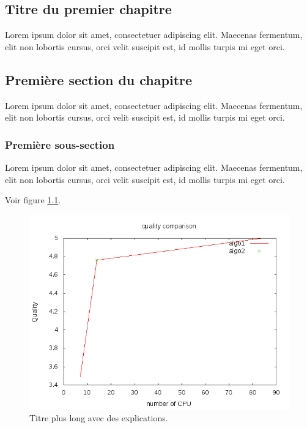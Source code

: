 \begin{bibunit}

\clearemptydoublepage
\chapter{Titre du premier chapitre}
\label{chap:1}

Lorem ipsum dolor sit amet, consectetuer adipiscing elit. Maecenas fermentum, elit non lobortis cursus, orci velit suscipit est, id mollis turpis mi eget orci.

\section{Première section du chapitre}

Lorem ipsum dolor sit amet, consectetuer adipiscing elit. Maecenas fermentum, elit non lobortis cursus, orci velit suscipit est, id mollis turpis mi eget orci.

\subsection{Première sous-section}

Lorem ipsum dolor sit amet, consectetuer adipiscing elit. Maecenas fermentum, elit non lobortis cursus, orci velit suscipit est, id mollis turpis mi eget orci.

Voir figure \ref{fig:mafigure2}.


\begin{figure}[htbp]
   \begin{center}
      \includegraphics[width=0.8\linewidth]{Chapitre1/Ch1-Figures/comparison.png}
   \end{center}
   \caption[titre court pour la liste des figures]
   {\footnotesize Titre plus long avec des explications.}
   \label{fig:mafigure2}
\end{figure}


\end{bibunit}
